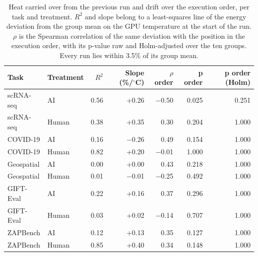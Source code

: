 \begin{table}[ht]
\centering
\caption{Heat carried over from the previous run and drift over the execution order, per task and treatment. $R^2$ and slope belong to a least-squares line of the energy deviation from the group mean on the GPU temperature at the start of the run. $\rho$ is the Spearman correlation of the same deviation with the position in the execution order, with its p-value raw and Holm-adjusted over the ten groups. Every run lies within 3.5\% of its group mean.} 
\label{tab:02_carry_over}
\begingroup\small
\begin{tabular}{llrrrrr}
  \toprule
Task & Treatment & $R^2$ & Slope (\%/$^\circ$C) & $\rho$ order & p order & p order (Holm) \\ 
  \midrule
scRNA-seq & AI & 0.56 & +0.26 & $-$0.50 & 0.025 & 0.251 \\ 
  scRNA-seq & Human & 0.38 & +0.35 & 0.30 & 0.204 & 1.000 \\ 
  COVID-19 & AI & 0.16 & $-$0.26 & 0.49 & 0.154 & 1.000 \\ 
  COVID-19 & Human & 0.82 & +0.20 & $-$0.01 & 1.000 & 1.000 \\ 
  Geospatial & AI & 0.00 & +0.00 & 0.43 & 0.218 & 1.000 \\ 
  Geospatial & Human & 0.01 & $-$0.01 & $-$0.25 & 0.492 & 1.000 \\ 
  GIFT-Eval & AI & 0.22 & +0.16 & 0.37 & 0.296 & 1.000 \\ 
  GIFT-Eval & Human & 0.03 & +0.02 & $-$0.14 & 0.707 & 1.000 \\ 
  ZAPBench & AI & 0.12 & +0.13 & 0.35 & 0.127 & 1.000 \\ 
  ZAPBench & Human & 0.85 & +0.40 & 0.34 & 0.148 & 1.000 \\ 
   \bottomrule
\end{tabular}
\endgroup
\end{table}
